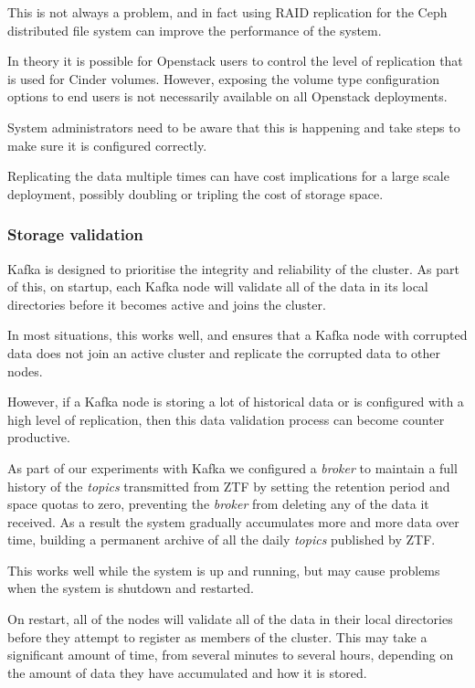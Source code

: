 \documentclass{article}
\newcommand{\openstack} {Openstack\xspace}
\newcommand{\ceph} {Ceph\xspace}
\newcommand{\kafka} {Kafka\xspace}
\newcommand{\kftopics} {\textit{topics}\xspace}
\newcommand{\kfbroker} {\textit{broker}\xspace}
\newcommand{\ztf} {ZTF\xspace}
\begin{document}
This is not always a problem, and in fact using RAID replication for the \ceph distributed file system can improve the performance of the system.

In theory it is possible for \openstack users to control the level of replication that is used for Cinder volumes. However, exposing the volume type configuration options to end users is not necessarily available on all \openstack deployments.

System administrators need to be aware that this is happening and take steps to make sure it is configured correctly. 

Replicating the data multiple times can have cost implications for a large scale deployment, possibly doubling or tripling the cost of storage space.

\subsubsection{Storage validation}
\label{storage-validation}

\kafka is designed to prioritise the integrity and reliability of the cluster.
As part of this, on startup, each \kafka node will validate all of the data in its local directories before it becomes active and joins the cluster.

In most situations, this works well, and ensures that a \kafka node with corrupted data does not join an active cluster and replicate the corrupted data to other nodes.

However, if a \kafka node is storing a lot of historical data or is configured with a high level of replication, then this data validation process can become counter productive.

As part of our experiments with \kafka we configured a \kfbroker to maintain a full history of the \kftopics transmitted from \ztf by setting the retention period and space quotas to zero, preventing the \kfbroker from deleting any of the data it received.
As a result the system gradually accumulates more and more data over time, building a permanent archive of all the daily \kftopics published by \ztf.

This works well while the system is up and running, but may cause problems when the system is shutdown and restarted.

On restart, all of the nodes will validate all of the data in their local directories before they attempt to register as members of the cluster.
This may take a significant amount of time, from several minutes to several hours, depending on the amount of data they have accumulated and how it is stored.
\end{document}
